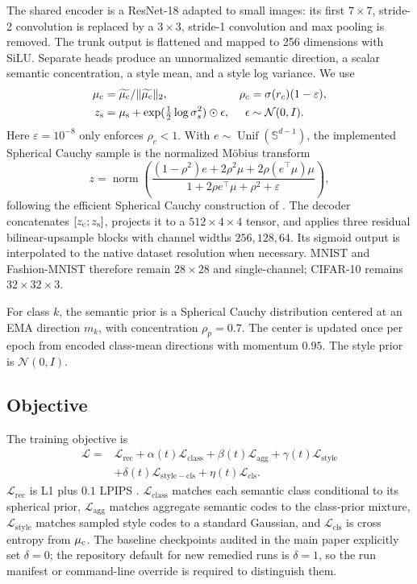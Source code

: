 The shared encoder is a ResNet-18 adapted to small images: its first
$7\times7$, stride-2 convolution is replaced by a $3\times3$, stride-1
convolution and max pooling is removed.  The trunk output is flattened and
mapped to 256 dimensions with SiLU.  Separate heads produce an unnormalized
semantic direction, a scalar semantic concentration, a style mean, and a
style log variance.  We use
\begin{align}
\mu_{\mathrm{c}}&=\widetilde{\mu_{\mathrm{c}}}/\|\widetilde{\mu_{\mathrm{c}}}\|_2, &
\rho_c&=\sigma(r_c)(1-\varepsilon),\\
z_{\mathrm{s}}&=\mu_{\mathrm{s}}+\exp(\tfrac12\log\sigma_s^2)\odot\epsilon,
&\epsilon&\sim\mathcal N(0,I).
\end{align}
Here $\varepsilon=10^{-8}$ only enforces $\rho_c<1$.  With
$e\sim\operatorname{Unif}(\mathbb S^{d-1})$, the implemented Spherical Cauchy
sample is the normalized M\"obius transform
\begin{equation}
z=\operatorname{norm}\!\left(
\frac{(1-\rho^2)e+2\rho^2\mu+2\rho(e^\top\mu)\mu}
{1+2\rho e^\top\mu+\rho^2+\varepsilon}\right),
\end{equation}
following the efficient Spherical Cauchy construction of
\citet{sablica2025hyperspherical}.  The decoder concatenates $[z_{\mathrm{c}};z_{\mathrm{s}}]$, projects it to a
$512\times4\times4$ tensor, and applies three residual bilinear-upsample
blocks with channel widths $256,128,64$.  Its sigmoid output is interpolated
to the native dataset resolution when necessary.  MNIST and Fashion-MNIST
therefore remain $28\times28$ and single-channel; CIFAR-10 remains
$32\times32\times3$.

For class $k$, the semantic prior is a Spherical Cauchy distribution centered
at an EMA direction $m_k$, with concentration $\rho_p=0.7$.  The center is
updated once per epoch from encoded class-mean directions with momentum
$0.95$.  The style prior is $\mathcal N(0,I)$.

\subsection{Objective}

The training objective is
\begin{align}
\mathcal L={}&\mathcal L_{\mathrm{rec}}
+\alpha(t)\mathcal L_{\mathrm{class}}
+\beta(t)\mathcal L_{\mathrm{agg}}
+\gamma(t)\mathcal L_{\mathrm{style}}\nonumber\\
&+\delta(t)\mathcal L_{\mathrm{style-cls}}
+\eta(t)\mathcal L_{\mathrm{cls}}.
\end{align}
$\mathcal L_{\mathrm{rec}}$ is L1 plus $0.1$ LPIPS
\citep{zhang2018unreasonable}.  $\mathcal L_{\mathrm{class}}$ matches each
semantic class conditional to its spherical prior, $\mathcal L_{\mathrm{agg}}$
matches aggregate semantic codes to the class-prior mixture,
$\mathcal L_{\mathrm{style}}$ matches sampled style codes to a standard
Gaussian, and $\mathcal L_{\mathrm{cls}}$ is cross entropy from $\mu_{\mathrm{c}}$.
The baseline checkpoints audited in the main paper explicitly set
$\delta=0$; the repository default for new remedied runs is $\delta=1$, so
the run manifest or command-line override is required to distinguish them.

